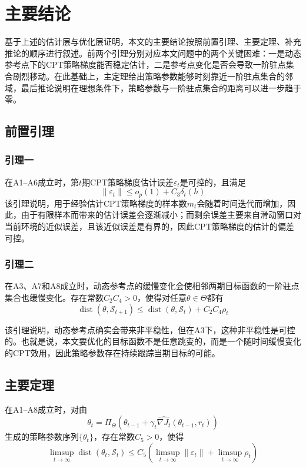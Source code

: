 \documentclass{sufethesismas}
\begin{document}
\section{主要结论}

基于上述的估计层与优化层证明，本文的主要结论按照前置引理、主要定理、补充推论的顺序进行叙述。前两个引理分别对应本文问题中的两个关键困难：一是动态参考点下的CPT策略梯度能否稳定估计，二是参考点变化是否会导致一阶驻点集合剧烈移动。在此基础上，主定理给出策略参数能够时刻靠近一阶驻点集合的邻域，最后推论说明在理想条件下，策略参数与一阶驻点集合的距离可以进一步趋于零。

\subsection{前置引理}

\subsubsection{引理一}
在A1--A6成立时，第$t$期CPT策略梯度估计误差$\varepsilon_t$是可控的，且满足
\begin{equation}
\|\varepsilon_t\|
\le
o_p(1)+C_3\delta_t(h)
\end{equation}
该引理说明，用于经验估计CPT策略梯度的样本数$m_t$会随着时间迭代而增加，因此，由于有限样本而带来的估计误差会逐渐减小；而剩余误差主要来自滑动窗口对当前环境的近似误差，且该近似误差是有界的，因此CPT策略梯度的估计的偏差可控。

\subsubsection{引理二}
在A3、A7和A8成立时，动态参考点的缓慢变化会使相邻两期目标函数的一阶驻点集合也缓慢变化。存在常数$C_2 C_4>0$，使得对任意$\theta \in \Theta$都有
\begin{equation}
\operatorname{dist}(\theta,\mathcal S_{t+1})
\le
\operatorname{dist}(\theta,\mathcal S_t)
+
C_2 C_4 \rho_t
\end{equation}

该引理说明，动态参考点确实会带来非平稳性，但在A3下，这种非平稳性是可控的。也就是说，本文要优化的目标函数不是任意跳变的，而是一个随时间缓慢变化的CPT效用，因此策略参数存在持续跟踪当期目标的可能。

\subsection{主要定理}
在A1--A8成立时，对由
\begin{equation}
\theta_t
=
\Pi_{\Theta}
\left(
\theta_{t-1}
+
\gamma_t
\widehat{\nabla J_t}(\theta_{t-1},r_t)
\right)
\end{equation}
生成的策略参数序列$\{\theta_t\}$，存在常数$C_5>0$，使得
\begin{equation}
\limsup_{t\to\infty}
\operatorname{dist}(\theta_t,\mathcal S_t)
\le
C_5
\left(
\limsup_{t\to\infty}\|\varepsilon_t\|
+
\limsup_{t\to\infty}\rho_t
\right)
\end{equation}
\end{document}
